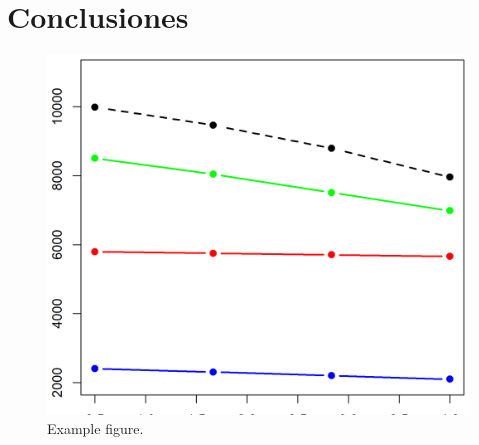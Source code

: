 \documentclass[11pt]{article}
\begin{document}
\section{Conclusiones}

\begin{center}
    
\end{center}


\medskip

 

\newpage


\begin{figure}[H]
    \centering
        \includegraphics[scale=.8]{figures/example_figure.png}
    \caption{Example figure.}
    \label{fig:1}
\end{figure}

\end{document}
